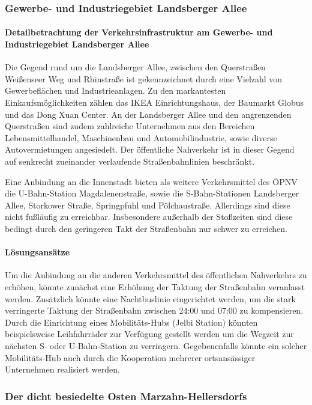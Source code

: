 \subsubsection{Gewerbe- und Industriegebiet Landsberger Allee}
\paragraph{Detailbetrachtung der Verkehrsinfrastruktur am Gewerbe- und Industriegebiet Landsberger Allee}
Die Gegend rund um die Landsberger Allee, zwischen den Querstraßen Weißenseer Weg und Rhinstraße ist gekennzeichnet durch eine Vielzahl von Gewerbeflächen und Industrieanlagen. Zu den markantesten Einkaufsmöglichkeiten zählen das IKEA Einrichtungshaus, der Baumarkt Globus und das Dong Xuan Center. An der Landsberger Allee und den angrenzenden Querstraßen sind zudem zahlreiche Unternehmen aus den Bereichen Lebensmittelhandel, Maschinenbau und Automobilindustrie, sowie diverse Autovermietungen angesiedelt. Der öffentliche Nahverkehr ist in dieser Gegend auf senkrecht zueinander verlaufende Straßenbahnlinien beschränkt.


Eine Anbindung an die Innenstadt bieten als weitere Verkehrsmittel des ÖPNV die U-Bahn-Station Magdalenenstraße, sowie die S-Bahn-Stationen Landsberger Allee, Storkower Straße, Springpfuhl und Pölchaustraße. Allerdings sind diese nicht fußläufig zu erreichbar. Insbesondere außerhalb der Stoßzeiten sind diese bedingt durch den geringeren Takt der Straßenbahn nur schwer zu erreichen.

\paragraph{Lösungsansätze}
Um die Anbindung an die anderen Verkehrsmittel des öffentlichen Nahverkehrs zu erhöhen, könnte zunächst eine Erhöhung der Taktung der Straßenbahn veranlasst werden. Zusätzlich könnte eine Nachtbuslinie eingerichtet werden, um die stark verringerte Taktung der Straßenbahn zwischen 24:00 und 07:00 zu kompensieren. Durch die Einrichtung eines Mobilitäts-Hubs (Jelbi Station) könnten beispielsweise Leihfahrräder zur Verfügung gestellt werden um die Wegzeit zur nächsten S- oder U-Bahn-Station zu verringern. Gegebenenfalls könnte ein solcher Mobilitäts-Hub auch durch die Kooperation mehrerer ortsansässiger Unternehmen realisiert werden.

\subsubsection{Der dicht besiedelte Osten Marzahn-Hellersdorfs}
